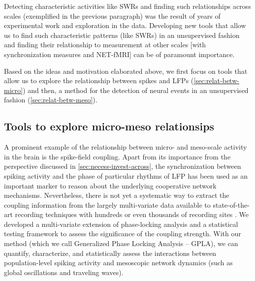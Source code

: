 Detecting characteristic activities like SWRs and finding such relationships across
scales (exemplified in the previous paragraph) was the result of years of experimental work and exploration in the data.
Developing new tools that allow us to find such characteristic
patterns (like SWRs) in an unsupervised fashion and finding their
relationship to measurement at other scales
[\eg with synchronization measures and NET-fMRI]
can be of paramount importance.

Based on the ideas and motivation elaborated above, we first focus on tools that allow us to explore
the relationship between spikes and LFPs (\autoref{sec:relat-betw-micro})
and then, a method for the detection of neural events in an unsupervised fashion (\autoref{sec:relat-betw-meso}).


\subsection{Tools to explore micro-meso relationsips}\label{sec:relat-betw-micro}
A prominent example of the relationship between micro- and meso-scale activity in the brain is the spike-field coupling.
Apart from its importance from the perspective discussed in \autoref{sec:necess-invest-across},
the synchronization between spiking activity and the phase of particular rhythms of LFP has been used as an important marker to reason about the underlying cooperative network mechanisms.
Nevertheless, there is not yet a systematic way to extract the coupling information from the largely multi-variate data available to state-of-the-art recording techniques
\cite{dickeySingleUnitStabilityUsing2009,junFullyIntegratedSilicon2017a,juavinettChronicallyImplantedNeuropixels2019}
with hundreds or even thousands of recording sites
\cite{pesaranInvestigatingLargescaleBrain2018,junFullyIntegratedSilicon2017a,buzsakiLargescaleRecordingNeuronal2004,fukushimaStudyingBrainFunctions2015}. 
We developed a multi-variate extension of phase-locking analysis 
and a statistical testing framework to assess the significance of the coupling strength.
With our method (which we call Generalized Phase Locking Analysis -- GPLA),
we can quantify, characterize, and statistically assess the interactions between population-level spiking activity and mesoscopic network dynamics (such as global oscillations and traveling waves).

